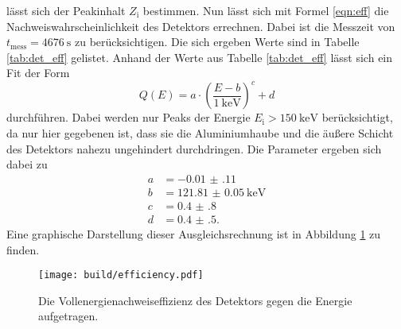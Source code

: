 lässt sich der Peakinhalt $Z_\text{i}$ bestimmen. Nun lässt sich mit Formel \ref{eqn:eff}
die Nachweiswahrscheinlichkeit des Detektors errechnen. Dabei ist die Messzeit von $t_\text{mess} = \SI{4676}{\second}$
zu berücksichtigen. Die sich ergeben Werte sind in Tabelle \ref{tab:det_eff} gelistet.
Anhand der Werte aus Tabelle \ref{tab:det_eff} lässt sich ein Fit der Form
\begin{equation}
  \label{eqn:Potenz}
  Q(E) = a \cdot \left(\frac{E-b}{\SI{1}{\kilo\electronvolt}}\right)^c + d
\end{equation}
durchführen. Dabei werden nur Peaks der Energie $E_\text{i} > \SI{150}{\kilo\electronvolt}$ berücksichtigt,
da nur hier gegebenen ist, dass sie die Aluminiumhaube und die äußere Schicht des Detektors nahezu
ungehindert durchdringen. Die Parameter ergeben sich dabei zu
\begin{align*}
  a &= \num{-0.01(11)} \\
  b &= \SI{121.81(5)}{\kilo\electronvolt} \\
  c &= \num{0.4(8)} \\
  d &= \num{0.4(5)}.
\end{align*}
Eine graphische Darstellung dieser Ausgleichsrechnung ist in Abbildung \ref{fig:effizenz} zu finden.

\begin{figure}[htb]
 \centering
 \texttt{[image: build/efficiency.pdf]}
 \caption{Die Vollenergienachweiseffizienz des Detektors gegen die Energie aufgetragen.}
 \label{fig:effizenz}
\end{figure}

\FloatBarrier


